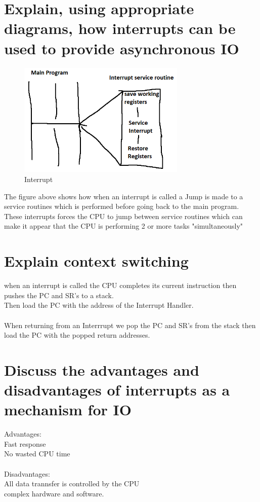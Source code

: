 \documentclass{article}
\begin{document}
\section{Explain, using appropriate diagrams, how interrupts can be used to provide asynchronous IO}
\begin{figure}[h]
    \centering
    \includegraphics[width = 80mm]{IO2.PNG}
    \caption{Interrupt}
    \label{fig:my_label}
\end{figure}

The figure above shows how when an interrupt is called a Jump is made to a
service routines which is performed before going back to the main program.\\
These interrupts forces the CPU to jump between service routines which can make
it appear that the CPU is performing 2 or more tasks "simultaneously"

\section{Explain context switching}

when an interrupt is called the CPU completes its current instruction then
pushes the PC and SR's to a stack.\\
Then load the PC with the address of the Interrupt Handler.\\\\
When returning from an Interrrupt we pop the PC and SR's from the stack then
load the PC with the popped return addresses.

\section{Discuss the advantages and disadvantages of interrupts as a mechanism for IO}
Advantages:\\
Fast response\\
No wasted CPU time\\\\
Disadvantages:\\
All data trannsfer is controlled by the CPU\\
complex hardware and software.
\end{document}
